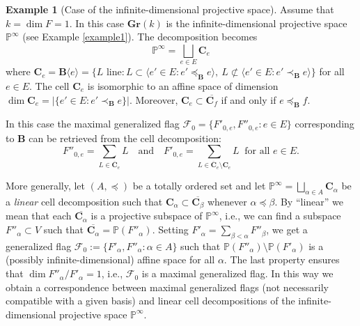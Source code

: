\documentclass[12pt]{amsart}
\theoremstyle{definition}
\newtheorem{example}{Example}
\begin{document}
\begin{example}[Case of the infinite-dimensional projective space]
\label{example-3}
Assume that $k=\dim F=1$. In this case $\mathbf{Gr}(k)$ is the infinite-dimensional projective space $\mathbb{P}^\infty$ (see Example \ref{example1}). The decomposition becomes
\[\mathbb{P}^\infty=\bigsqcup_{e\in E}\mathbf{C}_e\]
where $\mathbf{C}_e=\mathbf{B}\langle e\rangle=\{L\mbox{ line}:L\subset \langle e'\in E:e'\preceq_\mathbf{B}e\rangle,\ L\not\subset\langle e'\in E:e'\prec_\mathbf{B} e\rangle\}$ for all $e\in E$. The cell $\mathbf{C}_e$ is isomorphic to an affine space of dimension $\dim \mathbf{C}_e=|\{e'\in E:e'\prec_{\mathbf{B}}e\}|$. Moreover, $\mathbf{C}_e\subset\overline{\mathbf{C}_f}$ if and only if $e\preceq_{\mathbf{B}} f$.

In this case the maximal generalized flag $\mathcal{F}_0=\{F'_{0,e},F''_{0,e}:e\in E\}$ corresponding to $\mathbf{B}$ can be retrieved from the cell decomposition:
\[F''_{0,e}=\sum_{L\in\overline{\mathbf{C}}_e}L\quad\mbox{and}\quad F'_{0,e}=\sum_{L\in\overline{\mathbf{C}}_e\setminus \mathbf{C}_e}L\ \mbox{ for all $e\in E$.}\]

More generally, let $(A,\preceq)$ be a totally ordered set and let $\mathbb{P}^\infty=\bigsqcup_{\alpha\in A}\mathbf{C}_\alpha$ be a {\it linear} cell decomposition such that $\mathbf{C}_\alpha\subset\overline{\mathbf{C}_\beta}$ whenever $\alpha\preceq\beta$. By ``linear'' we mean that each $\overline{\mathbf{C}_\alpha}$ is a projective subspace of $\mathbb{P}^\infty$, i.e., we can find a subspace $F''_\alpha\subset V$ such that $\overline{\mathbf{C}_\alpha}=\mathbb{P}(F''_\alpha)$.
Setting $F'_\alpha=\sum_{\beta<\alpha} F''_\beta$,
we get a generalized flag $\mathcal{F}_0:=\{F'_\alpha, F''_\alpha:\alpha\in A\}$ such that
$\mathbb{P}(F''_\alpha)\setminus \mathbb{P}(F'_\alpha)$ is a (possibly infinite-dimensional) affine space for all $\alpha$.
The last property ensures that $\dim F''_\alpha/F'_\alpha=1$, i.e., $\mathcal{F}_0$ is a maximal generalized flag. In this way we obtain a correspondence between maximal generalized flags (not necessarily compatible with a given basis) and linear cell decompositions of the infinite-dimensional projective space $\mathbb{P}^\infty$.
\end{example}
\end{document}
